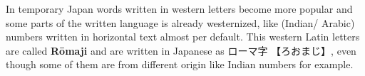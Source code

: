 

In temporary Japan words written in western letters become more popular and
some parts of the written language is already westernized, like (Indian/
Arabic) numbers written in horizontal text almost per default. This western
Latin letters are called \textbf{Rōmaji} and are written in Japanese as
{ローマ字} {【ろおまじ】}, even though some of them are from different origin
like Indian numbers for example.

